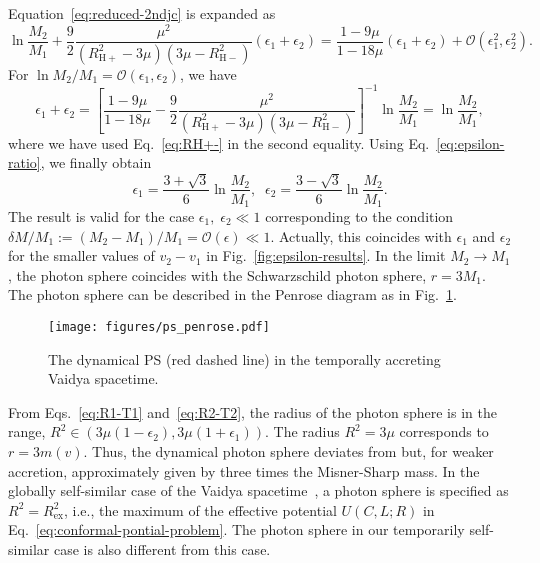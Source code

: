 \documentclass[prd,showpacs,preprintnumbers,groupedaddress,superscriptaddress,nofootinbib,11pt]{revtex4-1} %
\theoremstyle{newplain}
\newcommand{\mr}[1]{\mathrm{#1}}
\begin{document}
Equation~\eqref{eq:reduced-2ndjc} is expanded as 
\begin{equation}
\ln\frac{M_2}{M_1}+\frac{9}{2}\frac{\mu^2}{(R_{\mr{H}+}^2-3\mu)(3\mu-R_{\mr{H}-}^2)}({\epsilon}_1+{\epsilon}_2)
=\frac{1-9\mu}{1-18\mu}({\epsilon}_1+{\epsilon}_2)+\mathcal{O}({\epsilon}_1^2,{\epsilon}_2^2).
\end{equation}
For $\ln M_2/M_1=\mathcal{O}({\epsilon}_1,{\epsilon}_2)$, we have
\begin{equation}
{\epsilon}_1+{\epsilon}_2
=\left[\frac{1-9\mu}{1-18\mu}-\frac{9}{2}\frac{\mu^2}{(R_{\mr{H}+}^2-3\mu)(3\mu-R_{\mr{H}-}^2)}\right]^{-1}\ln\frac{M_2}{M_1}
=\ln\frac{M_2}{M_1},
\end{equation}
where we have used Eq.~\eqref{eq:RH+-} in the second equality.
Using Eq.~\eqref{eq:epsilon-ratio}, we finally obtain
\begin{equation}
\label{eq:linear-epsilon}
{\epsilon}_1=\frac{3+\sqrt{3}}{6}\ln\frac{M_2}{M_1},\;\; 
{\epsilon}_2=\frac{3-\sqrt{3}}{6}\ln\frac{M_2}{M_1}.
\end{equation}
The result is valid for the case $\epsilon_1,\;\epsilon_2\ll1$ corresponding to the condition $\delta M/M_1:=(M_2-M_1)/M_1=\mathcal{O}(\epsilon)\ll1$.
Actually, this coincides with $\epsilon_1$ and $\epsilon_2$ for the smaller values of $v_2-v_1$ in Fig.~\ref{fig:epsilon-results}.
In the limit $M_2\to M_1$, the photon sphere coincides with the Schwarzschild photon sphere, $r=3M_1$.
The photon sphere can be described in the Penrose diagram as in Fig.~\ref{fig:ps-penrose}.
\begin{figure}[t]
\texttt{[image: figures/ps\_penrose.pdf]}
\caption{\label{fig:ps-penrose}
The dynamical PS (red dashed line) in the temporally accreting Vaidya spacetime.}
\end{figure}
\par
From Eqs.~\eqref{eq:R1-T1} and~\eqref{eq:R2-T2}, the radius of the photon sphere is in the range, $R^2\in(3\mu(1-\epsilon_2),3\mu(1+\epsilon_1))$.
The radius $R^2=3\mu$ corresponds to $r=3m(v)$.
Thus, the dynamical photon sphere deviates from but, for weaker accretion, approximately given by three times the Misner-Sharp mass.
In the globally self-similar case of the Vaidya spacetime~\cite{Solanki_2022}, a photon sphere is specified as $R^2=R_{\mr{ex}}^2$, i.e., the maximum of the effective potential $U(C,L;R)$ in Eq.~\eqref{eq:conformal-pontial-problem}.
The photon sphere in our temporarily self-similar case is also different from this case.

\afterpage{\clearpage}
\newpage
\end{document}
